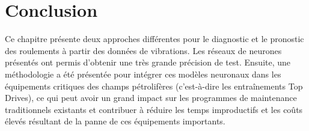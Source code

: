 \section{Conclusion}
Ce chapitre présente deux approches différentes pour le diagnostic et le pronostic des roulements à partir des données de vibrations. Les réseaux de neurones présentés ont permis d'obtenir une très grande précision de test. Ensuite, une méthodologie a été présentée pour intégrer ces modèles neuronaux dans les équipements critiques des champs pétrolifères (c'est-à-dire les entraînements Top Drives), ce qui peut avoir un grand impact sur les programmes de maintenance traditionnels existants et contribuer à réduire les temps improductifs et les coûts élevés résultant de la panne de ces équipements importants.

